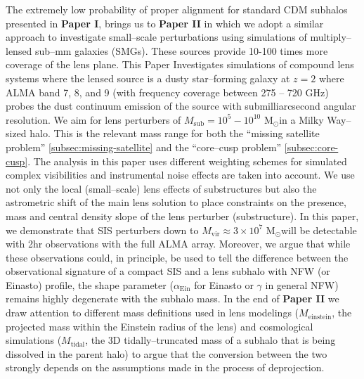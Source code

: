 \documentclass[a4wide,12pt]{book}
\newcommand{\msun }{$\mathrm{M}_{\odot}$}
\begin{document}
{The extremely low probability of proper alignment for standard CDM subhalos presented in {\bf Paper I}, brings us to {\bf Paper II} in which we adopt a similar approach to investigate small--scale perturbations using simulations of multiply--lensed sub--mm galaxies (SMGs).  These sources provide 10-100 times more coverage of the lens plane. This Paper Investigates simulations of compound lens systems where the lensed source is a dusty star--forming galaxy at $z = 2$ where ALMA band 7, 8, and 9 (with frequency coverage between 275 -- 720 GHz) probes the dust continuum emission of the source with submilliarcsecond angular resolution.  We aim for lens perturbers of $M_\mathrm{sub} = 10^5 - 10^{10} $ \msun  in a Milky Way--sized halo.  This is the relevant mass range for both the ``missing satellite problem'' \ref{subsec:missing-satellite} and the ``core--cusp problem'' \ref{subsec:core-cusp}. The analysis in this paper uses different weighting schemes for simulated complex visibilities and instrumental noise effects are taken into account. We use not only the local (small--scale) lens effects of substructures but also the astrometric shift of the main lens solution to place constraints on the presence, mass and central density slope of the lens perturber (substructure). In this paper, we demonstrate that SIS perturbers down to $M_\mathrm{vir} \approx 3\times 10^7 $ \msun  will be detectable with 2hr observations with the full ALMA array. Moreover, we argue that while these observations could, in principle, be used to tell the difference between the observational signature of a compact SIS and a lens subhalo with NFW (or Einasto) profile, the shape parameter ($\alpha_\mathrm{Ein}$ for Einasto or $\gamma$ in general NFW) remains highly degenerate with the subhalo mass. In the end of {\bf Paper II} we draw attention to different mass definitions used in lens modelings ($M_\mathrm{einstein}$, the projected mass within the Einstein radius of the lens) and cosmological simulations ($M_\mathrm{tidal}$, the 3D tidally--truncated mass of a subhalo that is being dissolved in the parent halo) to argue that the conversion between the two strongly depends on the assumptions made in the process of deprojection. 



 

}
\end{document}
